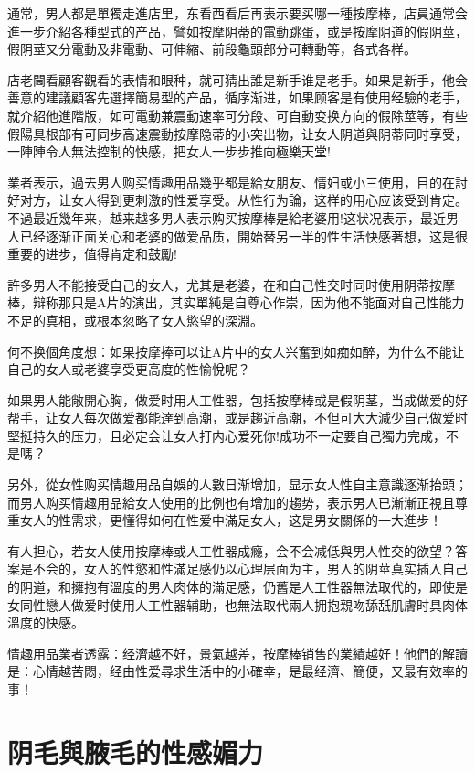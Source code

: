 \documentclass[12pt,UTF8]{ctexbook}
\begin{document}
通常，男人都是單獨走進店里，东看西看后再表示要买哪一種按摩棒，店員通常会進一步介紹各種型式的产品，譬如按摩阴蒂的電動跳蛋，或是按摩阴道的假阴莖，假阴莖又分電動及非電動、可伸縮、前段龜頭部分可轉動等，各式各样。

店老閪看顧客觀看的表情和眼种，就可猜出誰是新手谁是老手。如果是新手，他会善意的建議顧客先選擇簡易型的产品，循序渐进，如果顾客是有使用经驗的老手，就介紹他進階版，如可電動兼震動速率可分段、可自動变换方向的假除莖等，有些假陽具根部有可同步高速震動按摩隐蒂的小突出物，让女人阴道與阴蒂同时享受，一陣陣令人無法控制的快感，把女人一步步推向極樂天堂!

業者表示，過去男人购买情趣用品幾乎都是給女朋友、情妇或小三使用，目的在討好对方，让女人得到更刺激的性爱享受。从性行为論，这样的用心应该受到肯定。不過最近幾年来，越来越多男人表示购买按摩棒是給老婆用!这状况表示，最近男人已经逐渐正面关心和老婆的做爱品质，開始替另一半的性生活快感著想，这是很重要的进步，值得肯定和鼓勵!

許多男人不能接受自己的女人，尤其是老婆，在和自己性交时同时使用阴蒂按摩棒，辩称那只是A片的演出，其实單純是自尊心作崇，因为他不能面对自己性能力不足的真相，或根本忽略了女人慾望的深淵。

何不换個角度想：如果按摩捧可以让A片中的女人兴奮到如痴如醉，为什么不能让自己的女人或老婆享受更高度的性愉悅呢？

如果男人能敞開心胸，做爱时用人工性器，包括按摩棒或是假阴茎，当成做爱的好帮手，让女人每次做爱都能達到高潮，或是趨近高潮，不但可大大減少自己做爱时堅挺持久的压力，且必定会让女人打内心爱死你!成功不一定要自己獨力完成，不是嗎？

另外，從女性购买情趣用品自娛的人數日渐增加，显示女人性自主意識逐渐抬頭；而男人购买情趣用品給女人使用的比例也有增加的趨势，表示男人已漸漸正視且尊重女人的性需求，更懂得如何在性爱中滿足女人，这是男女關係的一大進步！

有人担心，若女人使用按摩棒或人工性器成瘾，会不会减低與男人性交的欲望？答案是不会的，女人的性慾和性滿足感仍以心理层面为主，男人的阴莖真实插入自己的阴道，和擁抱有溫度的男人肉体的滿足感，仍舊是人工性器無法取代的，即使是女同性戀人做爱时使用人工性器辅助，也無法取代兩人拥抱親吻舔舐肌膚时具肉体溫度的快感。

情趣用品業者透露：经濟越不好，景氣越差，按摩棒销售的業績越好！他們的解讀是：心情越苦悶，经由性爱尋求生活中的小確幸，是最经濟、簡便，又最有效率的事！

\chapter{阴毛與腋毛的性感媚力}
\end{document}
